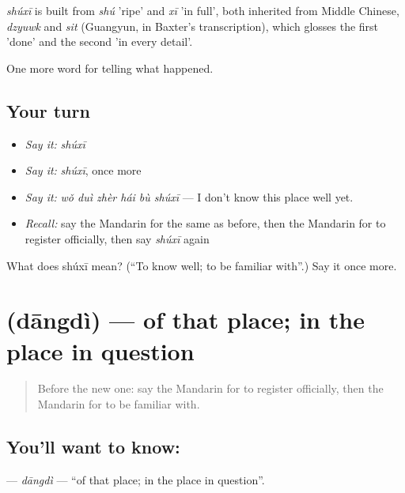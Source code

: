 \begin{cousinweb}
\emph{shúxī} is built from \emph{shú} 'ripe' and \emph{xī} 'in full', both inherited from Middle Chinese, \emph{dzyuwk} and \emph{sit} (Guangyun, in Baxter's transcription), which glosses the first 'done' and the second 'in every detail'.
\end{cousinweb}

\begin{grammarlens}[title={What you've built}]
One more word for telling what happened.
\end{grammarlens}

\subsection*{Your turn}
\begin{itemize}
\raggedright
  \item \emph{Say it:} \emph{shúxī}
  \item \emph{Say it:} \emph{shúxī}, once more
  \item \emph{Say it:} \emph{wǒ duì zhèr hái bù shúxī} — I don't know this place well yet.
  \item \emph{Recall:} say the Mandarin for the same as before, then the Mandarin for to register officially, then say \emph{shúxī} again
\end{itemize}

\begin{tcolorbox}[breakable,colback=teal!4,colframe=teal!35!black,title={Before you move on}]
What does shúxī mean? (\textquotedblleft{}To know well; to be familiar with\textquotedblright{}.) Say it once more.
\end{tcolorbox}
\section[\texorpdfstring{\zh{当地} (dāngdì)}{当地 (dāngdì)}]{ (dāngdì) — of that place; in the place in question}

\label{lesson:ZH-C316-dangdi}



\begin{quote}
Before the new one: say the Mandarin for to register officially, then the Mandarin for to be familiar with.
\end{quote}

\subsection*{You'll want to know: }
\textbf{} — \emph{dāngdì} — \textquotedblleft{}of that place; in the place in question\textquotedblright{}.

